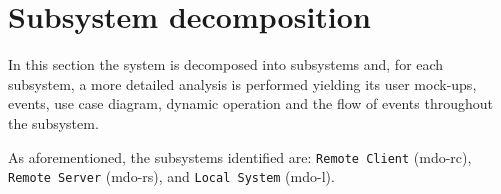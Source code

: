 
\section{Subsystem decomposition}
\label{sec:subsyst-decomp}
In this section the system is decomposed into subsystems and, for each
subsystem, a more detailed analysis is performed yielding its user mock-ups,
events, use case diagram, dynamic operation and the flow of events throughout
the subsystem.

As aforementioned, the subsystems identified are: \texttt{Remote Client}
(\gls{mdo-rc}), \texttt{Remote Server} (\gls{mdo-rs}), and \texttt{Local System} (\gls{mdo-l}).
%




